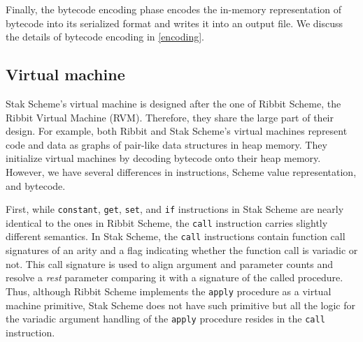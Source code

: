 \documentclass[sigplan]{acmart}
\begin{document}
Finally, the bytecode encoding phase encodes the in-memory representation of
bytecode into its serialized format and writes it into an output file.
We discuss the details of bytecode encoding in \ref{encoding}.

\subsection{Virtual machine} \label{vm}

Stak Scheme's virtual machine is designed after the one of Ribbit
Scheme, the Ribbit Virtual Machine (RVM).
Therefore, they share the large part of their design.
For example, both Ribbit and Stak Scheme's virtual machines represent
code and data as graphs of pair-like data structures in heap memory.
They initialize virtual machines by decoding bytecode onto
their heap memory.
However, we have several differences in instructions, Scheme value
representation, and bytecode.

First, while \texttt{constant}, \texttt{get}, \texttt{set}, and
\texttt{if} instructions in Stak Scheme are nearly identical to the ones in
Ribbit Scheme, the \texttt{call} instruction carries slightly
different semantics.
In Stak Scheme, the \texttt{call} instructions
contain function call signatures of an arity and
a flag indicating whether the function call is variadic or not.
This call signature is used to align argument and parameter counts and
resolve a \textit{rest} parameter comparing it with a signature of
the called procedure.
Thus, although Ribbit Scheme implements the \texttt{apply}
procedure as a virtual machine primitive, Stak Scheme does not have
such primitive but all the logic for the variadic argument handling
of the \texttt{apply} procedure resides in the \texttt{call} instruction.
\end{document}
